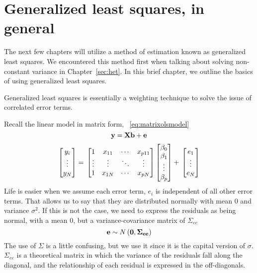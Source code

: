 

\chapter{Generalized least squares, in general}
\label{sec:glmchapter}

The next few chapters will utilize a method of estimation known as generalized least squares. We encountered this method first when talking about solving non-constant variance in Chapter~\ref{sec:het}. In this brief chapter, we outline the basics of using generalized least squares.

Generalized least squares is essentially a weighting technique to solve the issue of correlated error terms.

Recall the linear model in matrix form, ~\eqref{eq:matrixolsmodel}
\[
{\bf{y=Xb+e}}
\]
\[
\begin{bmatrix}
y_i \\
\vdots \\
y_N \\
\end{bmatrix}
= \\
\begin{bmatrix}
1&x_{11}&\cdots&x_{p11} \\
\vdots&\vdots&\ddots&\vdots \\
1&x_{1N}&\cdots&x_{pN} \\
\end{bmatrix}
\begin{bmatrix}
\beta_0 \\
\beta_1 \\
\vdots \\
\beta_p \\
\end{bmatrix}
+ \\
\begin{bmatrix}
e_1 \\
\vdots \\
e_N \\
\end{bmatrix}
\]
Life is easier when we assume each error term, $e_i$ is independent of all other error terms. That allows us to say that they are distributed normally with mean 0 and variance $\sigma^2$. If this is not the case, we need to express the residuals as being normal, with a mean 0, but a variance-covariance matrix of $\Sigma_{ee}$
\begin{equation}
{\bf e} \sim N\left({\bf 0,\Sigma_{ee}}\right)
\end{equation}
The use of $\Sigma$ is a little confusing, but we use it since it is the capital version of $\sigma$. $\Sigma_{ee}$ is a theoretical matrix in which the variance of the residuals fall along the diagonal, and the relationship of each residual is expressed in the off-diagonals.


